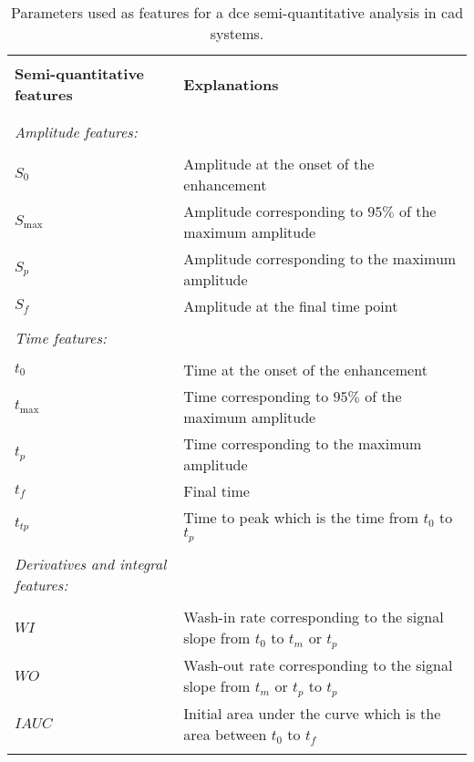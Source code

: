 \begin{table*}
	\caption{Parameters used as features for a \ac{dce} semi-quantitative analysis in \ac{cad} systems.}
	\small
	\renewcommand{\arraystretch}{.8}
	\begin{tabular}{p{.35\linewidth} p{.60\linewidth}}
		\hline \\ [-1.5ex]
		\textbf{Semi-quantitative features} & \textbf{Explanations} \\ \\ [-1.5ex]
		\hline \\ [-1.5ex]
		\textit{Amplitude features:} & \\ \\ [-1.5ex]
		\quad $S_0$ & Amplitude at the onset of the enhancement \\
		\quad $S_{\max}$ & Amplitude corresponding to $95\%$ of the maximum amplitude \\
		\quad $S_{p}$ & Amplitude corresponding to the maximum amplitude \\
		\quad $S_f$ & Amplitude at the final time point \\ \\ [-1.5ex]
		\textit{Time features:} & \\ \\ [-1.5ex]
		\quad $t_0$ & Time at the onset of the enhancement \\
		\quad $t_{\max}$ & Time corresponding to $95\%$ of the maximum amplitude \\
		\quad $t_{p}$ & Time corresponding to the maximum amplitude \\
		\quad $t_{f}$ & Final time \\
		\quad $t_{tp}$ & Time to peak which is the time from $t_0$ to $t_p$ \\ \\ [-1.5ex]
		\textit{Derivatives and integral features:} & \\ \\ [-1.5ex]
		\quad $WI$ & Wash-in rate corresponding to the signal slope from $t_0$ to $t_m$ or $t_p$ \\
		\quad $WO$ & Wash-out rate corresponding to the signal slope from $t_m$ or $t_p$ to $t_p$ \\
		\quad $IAUC$ & Initial area under the curve which is the area between $t_0$ to $t_{f}$ \\ \\ [-1.5ex]
		\hline
	\end{tabular}
	\label{tab:semiqua}
\end{table*}

